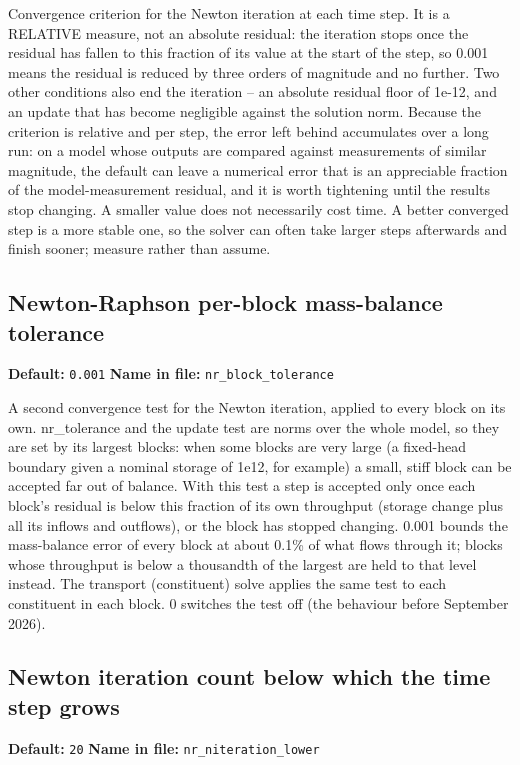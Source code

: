 \documentclass[11pt]{article}
\begin{document}
Convergence criterion for the Newton iteration at each time step. It is a RELATIVE measure, not an absolute residual: the iteration stops once the residual has fallen to this fraction of its value at the start of the step, so 0.001 means the residual is reduced by three orders of magnitude and no further. Two other conditions also end the iteration -- an absolute residual floor of 1e-12, and an update that has become negligible against the solution norm. Because the criterion is relative and per step, the error left behind accumulates over a long run: on a model whose outputs are compared against measurements of similar magnitude, the default can leave a numerical error that is an appreciable fraction of the model-measurement residual, and it is worth tightening until the results stop changing. A smaller value does not necessarily cost time. A better converged step is a more stable one, so the solver can often take larger steps afterwards and finish sooner; measure rather than assume.
\subsection{Newton-Raphson per-block mass-balance tolerance}
{\small \textbf{Default:} \texttt{0.\allowbreak{}001} \quad\textbullet\quad \textbf{Name in file:} \texttt{nr\_\allowbreak{}block\_\allowbreak{}tolerance}}

A second convergence test for the Newton iteration, applied to every block on its own. nr\_tolerance and the update test are norms over the whole model, so they are set by its largest blocks: when some blocks are very large (a fixed-head boundary given a nominal storage of 1e12, for example) a small, stiff block can be accepted far out of balance. With this test a step is accepted only once each block's residual is below this fraction of its own throughput (storage change plus all its inflows and outflows), or the block has stopped changing. 0.001 bounds the mass-balance error of every block at about 0.1\% of what flows through it; blocks whose throughput is below a thousandth of the largest are held to that level instead. The transport (constituent) solve applies the same test to each constituent in each block. 0 switches the test off (the behaviour before September 2026).
\subsection{Newton iteration count below which the time step grows}
{\small \textbf{Default:} \texttt{20} \quad\textbullet\quad \textbf{Name in file:} \texttt{nr\_\allowbreak{}niteration\_\allowbreak{}lower}}
\end{document}
